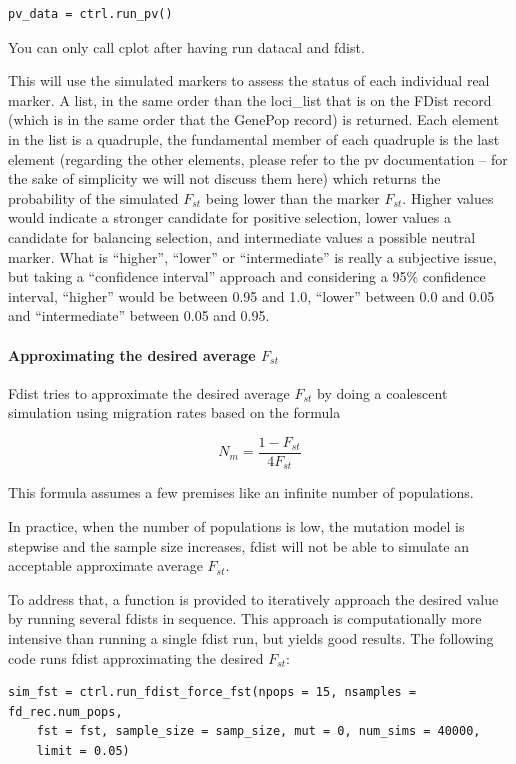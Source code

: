 \documentclass{report}
\begin{document}
\begin{verbatim}
pv_data = ctrl.run_pv()
\end{verbatim}

You can only call cplot after having run datacal and fdist.

This will use the simulated markers to assess the status of each
individual real marker. A list, in the same order than the loci\_list
that is on the FDist record (which is in the same order that the GenePop
record) is returned. Each element in the list is a quadruple, the
fundamental member of each quadruple is the last element (regarding the
other elements, please refer to the pv documentation -- for the
sake of simplicity we will not discuss them here) which returns the
probability of the simulated $F_{st}$ being lower than the marker $F_{st}$.
Higher values would indicate a stronger candidate for positive selection,
lower values a candidate for balancing selection, and intermediate values
a possible neutral marker. What is ``higher'', ``lower'' or ``intermediate''
is really a subjective issue, but taking a ``confidence interval'' approach
and considering a 95\% confidence interval, ``higher'' would be between 0.95
and 1.0, ``lower'' between 0.0 and 0.05 and ``intermediate'' between 0.05 and
0.95.

\paragraph{Approximating the desired average $F_{st}$}

Fdist tries to approximate the desired average $F_{st}$ by doing a
coalescent simulation using migration rates based on the formula

\[ N_{m} = \frac{1 - F_{st}}{4F_{st}} \]

This formula assumes a few premises like an infinite number of populations.

In practice, when the number of populations is low, the mutation model
is stepwise and the sample size increases, fdist will not be able to
simulate an acceptable approximate average $F_{st}$.

To address that, a function is provided to iteratively approach the desired
value by running several fdists in sequence. This approach is computationally
more intensive than running a single fdist run, but yields good results.
The following code runs fdist approximating the desired $F_{st}$:

\begin{verbatim}
sim_fst = ctrl.run_fdist_force_fst(npops = 15, nsamples = fd_rec.num_pops,
    fst = fst, sample_size = samp_size, mut = 0, num_sims = 40000,
    limit = 0.05)
\end{verbatim}
\end{document}
